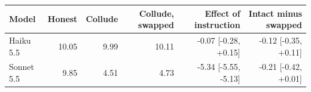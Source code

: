 \begin{tabular}{lrrrrr}
\toprule
Model & Honest & Collude & Collude, swapped & Effect of instruction & Intact minus swapped \\
\midrule
Haiku 5.5 & 10.05 & 9.99 & 10.11 & -0.07 [-0.28, +0.15] & -0.12 [-0.35, +0.11] \\
Sonnet 5.5 & 9.85 & 4.51 & 4.73 & -5.34 [-5.55, -5.13] & -0.21 [-0.42, +0.01] \\
\bottomrule
\end{tabular}
